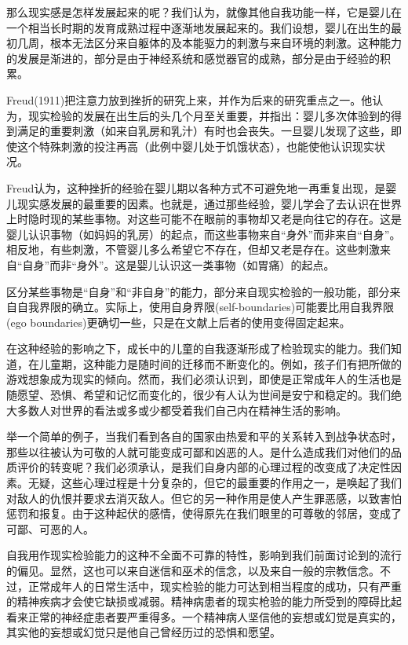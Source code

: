 \documentclass[UTF8,10pt,a4paper,openany]{book}
\begin{document}
那么现实感是怎样发展起来的呢？我们认为，就像其他自我功能一样，它是婴儿在一个相当长时期的发育成熟过程中逐渐地发展起来的。我们设想，婴儿在出生的最初几周，根本无法区分来自躯体的及本能驱力的刺激与来自环境的刺激。这种能力的发展是渐进的，部分是由于神经系统和感觉器官的成熟，部分是由于经验的积累。

Freud(1911)把注意力放到挫折的研究上来，并作为后来的研究重点之一。他认为，现实检验的发展在出生后的头几个月至关重要，并指出：婴儿多次体验到的得到满足的重要刺激（如来自乳房和乳汁）有时也会丧失。一旦婴儿发现了这些，即使这个特殊刺激的投注再高（此例中婴儿处于饥饿状态），也能使他认识现实状况。

Freud认为，这种挫折的经验在婴儿期以各种方式不可避免地一再重复出现，是婴儿现实感发展的最重要的因素。也就是，通过那些经验，婴儿学会了去认识在世界上时隐时现的某些事物。对这些可能不在眼前的事物却又老是向往它的存在。这是婴儿认识事物（如妈妈的乳房）的起点，而这些事物来自“身外”而非来自“自身”。相反地，有些刺激，不管婴儿多么希望它不存在，但却又老是存在。这些刺激来自“自身”而非“身外”。这是婴儿认识这一类事物（如胃痛）的起点。

区分某些事物是“自身”和“非自身”的能力，部分来自现实检验的一般功能，部分来自自我界限的确立。实际上，使用自身界限(self-boundaries)可能要比用自我界限(ego boundaries)更确切一些，只是在文献上后者的使用变得固定起来。

在这种经验的影响之下，成长中的儿童的自我逐渐形成了检验现实的能力。我们知道，在儿童期，这种能力是随时间的迁移而不断变化的。例如，孩子们有把所做的游戏想象成为现实的倾向。然而，我们必须认识到，即使是正常成年人的生活也是随愿望、恐惧、希望和记忆而变化的，很少有人认为世间是安宁和稳定的。我们绝大多数人对世界的看法或多或少都受着我们自己内在精神生活的影响。

举一个简单的例子，当我们看到各自的国家由热爱和平的关系转入到战争状态时，那些以往被认为可敬的人就可能变成可鄙和凶恶的人。是什么造成我们对他们的品质评价的转变呢？我们必须承认，是我们自身内部的心理过程的改变成了决定性因素。无疑，这些心理过程是十分复杂的，但它的最重要的作用之一，是唤起了我们对敌人的仇恨并要求去消灭敌人。但它的另一种作用是使人产生罪恶感，以致害怕惩罚和报复。由于这种起伏的感情，使得原先在我们眼里的可尊敬的邻居，变成了可鄙、可恶的人。

自我用作现实检验能力的这种不全面不可靠的特性，影响到我们前面讨论到的流行的偏见。显然，这也可以来自迷信和巫术的信念，以及来自一般的宗教信念。不过，正常成年人的日常生活中，现实检验的能力可达到相当程度的成功，只有严重的精神疾病才会使它缺损或减弱。精神病患者的现实枪验的能力所受到的障碍比起看来正常的神经症患者要严重得多。一个精神病人坚信他的妄想或幻觉是真实的，其实他的妄想或幻觉只是他自己曾经历过的恐惧和愿望。
\end{document}
